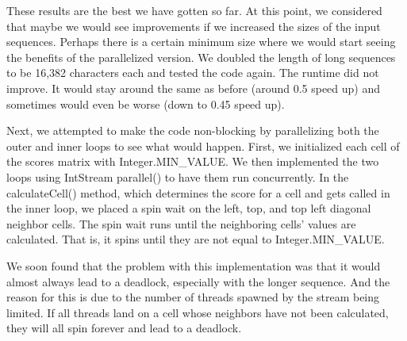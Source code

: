 \documentclass[conference]{IEEEtran}
\begin{document}
These results are the best we have gotten so far. At this point, we considered that maybe we would see improvements if we increased the sizes of the input sequences. Perhaps there is a certain minimum size where we would start seeing the benefits of the parallelized version. We doubled the length of long sequences to be 16,382 characters each and tested the code again. The runtime did not improve. It would stay around the same as before (around 0.5 speed up) and sometimes would even be worse (down to 0.45 speed up).

Next, we attempted to make the code non-blocking by parallelizing both the outer and inner loops to see what would happen. First, we initialized each cell of the scores matrix with Integer.MIN\_VALUE. We then implemented the two loops using IntStream parallel() to have them run concurrently. In the calculateCell() method, which determines the score for a cell and gets called in the inner loop, we placed a spin wait on the left, top, and top left diagonal neighbor cells. The spin wait runs until the neighboring cells' values are calculated. That is, it spins until they are not equal to Integer.MIN\_VALUE.

We soon found that the problem with this implementation was that it would almost always lead to a deadlock, especially with the longer sequence. And the reason for this is due to the number of threads spawned by the stream being limited. If all threads land on a cell whose neighbors have not been calculated, they will all spin forever and lead to a deadlock.



\end{document}
